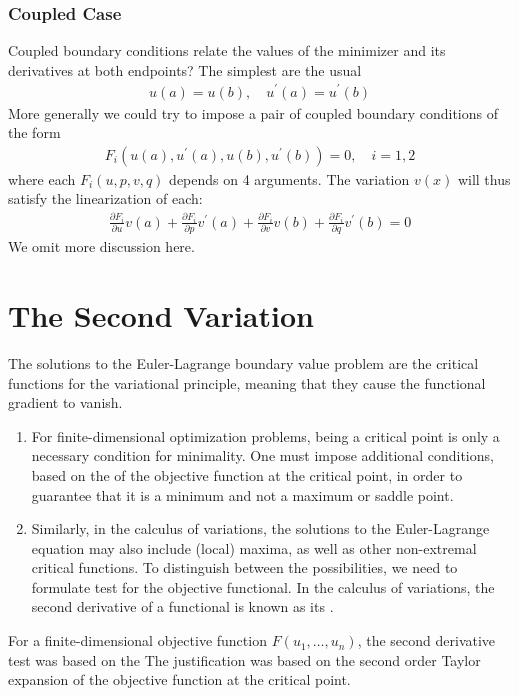 \documentclass{article}
\begin{document}
\subsubsection{Coupled Case}
Coupled boundary conditions relate the values of the minimizer and its derivatives at both endpoints? The simplest are the usual 
\begin{align*}
u(a)=u(b), \quad u^{\prime}(a)=u^{\prime}(b)
\end{align*}
More generally we could try to impose a pair of coupled boundary conditions of the form
\begin{align*}
F_{i}\left(u(a), u^{\prime}(a), u(b), u^{\prime}(b)\right)=0, \quad i=1,2
\end{align*}
where each $F_{i}(u, p, v, q)$ depends on 4 arguments. The variation $v(x)$ will thus satisfy the linearization of each: \begin{align*} \frac{\partial F_{i}}{\partial u} v(a)+\frac{\partial F_{i}}{\partial p} v^{\prime}(a)+\frac{\partial F_{i}}{\partial v} v(b)+\frac{\partial F_{i}}{\partial q} v^{\prime}(b)=0 \end{align*}
We omit more discussion here.

\section{The Second Variation}\label{sec:secondvar}
The solutions to the Euler-Lagrange boundary value problem are the critical functions for the variational principle, meaning that they cause the functional gradient to vanish. 
\begin{enumerate}
    \item For finite-dimensional optimization problems, being a critical point is only a necessary condition for minimality. One must impose additional conditions, based on the  of the objective function at the critical point, in order to guarantee that it is a minimum and not a maximum or saddle point.
    \item Similarly, in the calculus of variations, the solutions to the Euler-Lagrange equation may also include (local) maxima, as well as other non-extremal critical functions. To distinguish between the possibilities, we need to formulate test for the objective functional. In the calculus of variations, the second derivative of a functional is known as its .
\end{enumerate} 
For a finite-dimensional objective function $F\left(u_{1}, \ldots, u_{n}\right)$, the second derivative test was based on the  
The justification was based on the second order Taylor expansion of the objective function at the critical point. 
\end{document}
